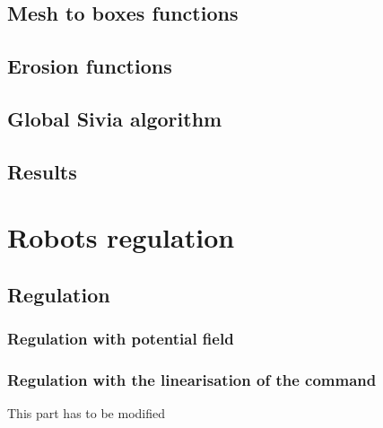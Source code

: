 \documentclass[10pt,a4paper]{report}
\begin{document}
\section{Mesh to boxes functions}


\section{Erosion functions}



\section{Global Sivia algorithm}



\section{Results}



\chapter{Robots regulation}

\section{Regulation}

\subsection{Regulation with potential field}

\subsection{Regulation with the linearisation of the command}

This part has to be modified 
\end{document}
